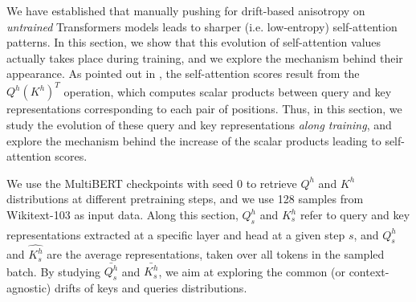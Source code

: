 We have established that manually pushing for drift-based anisotropy on \textit{untrained} Transformers models leads to sharper (i.e. low-entropy) self-attention patterns. In this section, we show that this evolution of self-attention values actually takes place during training, and we explore the mechanism behind their appearance. As pointed out in , the self-attention scores result from the $Q^h(K^h)^T$ operation, which computes scalar products between query and key representations corresponding to each pair of positions. Thus, in this section, we study the evolution of these query and key representations \textit{along training}, and explore the mechanism behind the increase of the scalar products leading to self-attention scores.

We use the MultiBERT checkpoints \citep{sellam2021multiberts} with seed 0 to retrieve $Q^h$ and $K^h$ distributions at different pretraining steps, and we use 128 samples from Wikitext-103 as input data. Along this section, $Q^h_s$ and $K^h_s$ refer to query and key representations extracted at a specific layer and head at a given step $s$, and $\hat{Q^h_s}$ and $\hat{K^h_s}$ are the average representations, taken over all tokens in the sampled batch. By studying $\bar{Q^h_s}$ and $\bar{K^h_s}$, we aim at exploring the common (or context-agnostic) drifts of keys and queries distributions.

